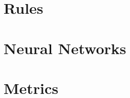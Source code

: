 %


\section{Rules}
\label{sec:2_basics/2_rules}



\section{Neural Networks}
\label{sec:2_basics/3_neural_networks}



\section{Metrics}
\label{sec:2_basics/4_metrics}

